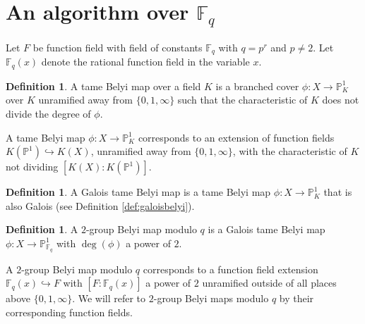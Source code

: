 \documentclass{dcthesis}
\newcommand{\PP}{\mathbb P}
\newcommand{\defi}[1]{\textsf{#1}}
\newcommand{\FF}{\mathbb{F}}
\numberwithin{equation}{section}
\theoremstyle{definition}
\newtheorem{definition}[equation]{Definition}
\theoremstyle{remark}
\begin{document}
{{  \section{An algorithm over $\FF_q$}{
    \label{sec:functionfieldalgorithm}
    Let $F$ be function field
    with field of constants
    $\FF_q$ with $q=p^r$ and $p\neq 2$.
    Let $\FF_q(x)$ denote the rational
    function field in the variable $x$.
    \begin{definition}
      \label{def:tamebelyimap}
      A \defi{tame Belyi map}
      over a field $K$
      is a branched cover
      $\phi\colon X\to\PP_K^1$
      over $K$ unramified away from
      $\{0,1,\infty\}$
      such that the characteristic of $K$
      does not divide the degree of $\phi$.
    \end{definition}
    A tame Belyi map $\phi\colon X\to\PP_K^1$
    corresponds to an extension of function fields
    $K(\PP^1)\hookrightarrow K(X)$,
    unramified away from $\{0,1,\infty\}$,
    with the characteristic of $K$ not dividing
    $[K(X):K(\PP^1)]$.
    \begin{definition}
      \label{def:galoistamebelyi}
      A \defi{Galois tame Belyi map}
      is a tame Belyi map $\phi\colon X\to\PP_K^1$
      that is also Galois
      (see Definition \ref{def:galoisbelyi}).
    \end{definition}
    \begin{definition}
      \label{def:pgroupbelyimapmodq}
      A \defi{$2$-group Belyi map modulo $q$}
      is a Galois tame Belyi map
      $\phi\colon X\to\PP_{\FF_q}^1$
      with $\deg(\phi)$ a power of $2$.
    \end{definition}
    A $2$-group Belyi map modulo $q$ corresponds
    to a function field extension
    $\FF_q(x)\hookrightarrow F$ with
    $[F:\FF_q(x)]$ a power of $2$
    unramified outside of all places above
    $\{0,1,\infty\}$.
    We will refer to $2$-group Belyi maps modulo $q$
    by their corresponding function fields.
}}}
\end{document}
